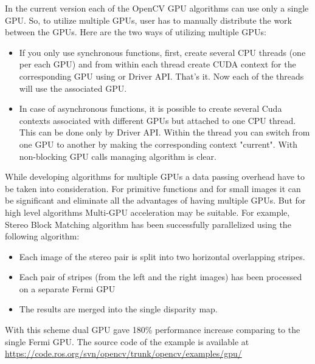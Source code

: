 In the current version each of the OpenCV GPU algorithms can use only a single GPU. So, to utilize multiple GPUs, user has to manually distribute the work between the GPUs. Here are the two ways of utilizing multiple GPUs:
\begin{itemize}
\item If you only use synchronous functions, first, create several CPU threads (one per each GPU) and from within each thread create CUDA context for the corresponding GPU using  or Driver API. That's it. Now each of the threads will use the associated GPU.
\item In case of asynchronous functions, it is possible to create several Cuda contexts associated with different GPUs but attached to one CPU thread. This can be done only by Driver API. Within the thread you can switch from one GPU to another by making the corresponding context "current". With non-blocking GPU calls managing algorithm is clear.
\end{itemize}
While developing algorithms for multiple GPUs a data passing overhead have to be taken into consideration. For primitive functions and for small images it can be significant and eliminate all the advantages of having multiple GPUs. But for high level algorithms Multi-GPU acceleration may be suitable. For example, Stereo Block Matching algorithm has been successfully parallelized using the following algorithm:
\begin{itemize}
\item
Each image of the stereo pair is split into two horizontal overlapping stripes.
\item
Each pair of stripes (from the left and the right images) has been processed on a separate Fermi GPU
\item
The results are merged into the single disparity map.
\end{itemize}
With this scheme dual GPU gave 180\% performance increase comparing to the single Fermi GPU. The source code of the example is available at
\url{https://code.ros.org/svn/opencv/trunk/opencv/examples/gpu/} 
